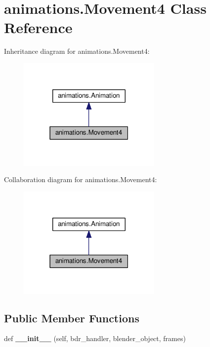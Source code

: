 \hypertarget{classanimations_1_1Movement4}{}\section{animations.\+Movement4 Class Reference}
\label{classanimations_1_1Movement4}


Inheritance diagram for animations.\+Movement4\+:\nopagebreak
\begin{figure}[H]
\begin{center}
\leavevmode
\includegraphics[width=198pt]{classanimations_1_1Movement4__inherit__graph}
\end{center}
\end{figure}


Collaboration diagram for animations.\+Movement4\+:\nopagebreak
\begin{figure}[H]
\begin{center}
\leavevmode
\includegraphics[width=198pt]{classanimations_1_1Movement4__coll__graph}
\end{center}
\end{figure}
\subsection*{Public Member Functions}
\begin{DoxyCompactItemize}
\item 
def {\bfseries \+\_\+\+\_\+init\+\_\+\+\_\+} (self, bdr\+\_\+handler, blender\+\_\+object, frames)\hypertarget{classanimations_1_1Movement4_a8bb1d458f8c33de7ea0f8b752df78115}{}\label{classanimations_1_1Movement4_a8bb1d458f8c33de7ea0f8b752df78115}

\end{DoxyCompactItemize}
